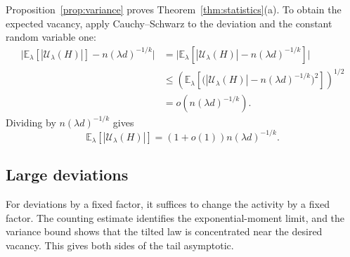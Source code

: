 \documentclass[11pt,reqno]{amsart}
\numberwithin{equation}{section}
\theoremstyle{plain}
\theoremstyle{definition}
\newcommand{\E}{\mathbb E}
\newcommand{\calU}{\mathcal U}
\begin{document}
Proposition~\ref{prop:variance} proves Theorem~\ref{thm:statistics}(a).
To obtain the expected vacancy, apply Cauchy--Schwarz to the deviation and the constant random variable one:
\[
    \begin{aligned}
        \bigl|\E_\lambda[|\calU_\lambda(H)|]-n(\lambda d)^{-1/k}\bigr|
        &=\bigl|\E_\lambda[|\calU_\lambda(H)|-n(\lambda d)^{-1/k}]\bigr|\\
        &\le\left(\E_\lambda\left[\bigl(|\calU_\lambda(H)|-n(\lambda d)^{-1/k}\bigr)^2\right]\right)^{1/2}\\
        &=o(n(\lambda d)^{-1/k}).
    \end{aligned}
\]
Dividing by $n(\lambda d)^{-1/k}$ gives
\begin{equation}\label{eq:mean-vacancy}
    \E_\lambda[|\calU_\lambda(H)|]=(1+o(1))n(\lambda d)^{-1/k}.
\end{equation}


\subsection{Large deviations}\label{subsec:largedeviations}

For deviations by a fixed factor, it suffices to change the activity by a fixed factor.
The counting estimate identifies the exponential-moment limit, and the variance bound shows that the tilted law is concentrated near the desired vacancy.
This gives both sides of the tail asymptotic.
\end{document}
